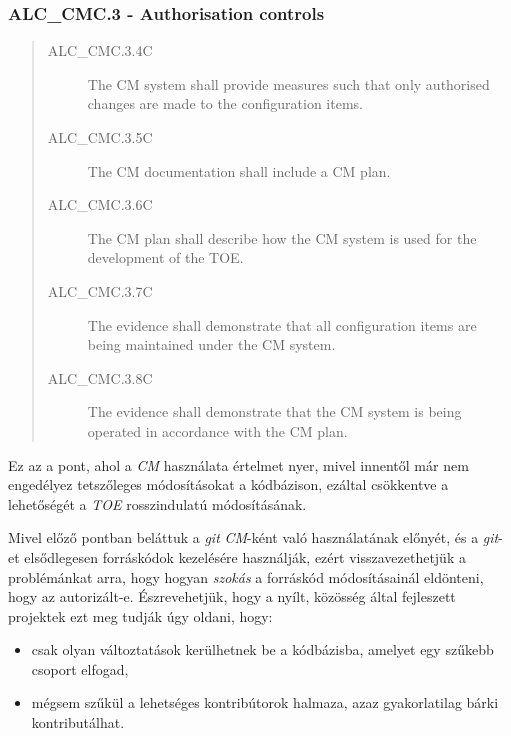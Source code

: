 \subsubsection{ALC\_CMC.3 - Authorisation controls}
\begin{quote}
    \begin{description}
        \item[ALC\_CMC.3.4C]{The CM system shall provide measures such that only authorised changes
            are made to the configuration items.}
        \item[ALC\_CMC.3.5C]{The CM documentation shall include a CM plan.}
        \item[ALC\_CMC.3.6C]{The CM plan shall describe how the CM system is used for the
            development of the TOE.}
        \item[ALC\_CMC.3.7C]{The evidence shall demonstrate that all configuration items are being
            maintained under the CM system.}
        \item[ALC\_CMC.3.8C]{The evidence shall demonstrate that the CM system is being operated in
            accordance with the CM plan.}
    \end{description}
\end{quote}

Ez az a pont, ahol a \emph{CM} használata értelmet nyer, mivel innentől már nem engedélyez
tetszőleges módosításokat a kódbázison, ezáltal csökkentve a lehetőségét a \emph{TOE} rosszindulatú
módosításának.

Mivel előző pontban beláttuk a \emph{git} \emph{CM}-ként való  használatának előnyét, és
a \emph{git}-et elsődlegesen forráskódok kezelésére használják, ezért visszavezethetjük
a problémánkat arra, hogy hogyan \emph{szokás} a forráskód módosításainál eldönteni, hogy az
autorizált-e.  Észrevehetjük, hogy a nyílt, közösség által fejleszett projektek ezt meg tudják úgy
oldani, hogy:
\begin{itemize}
    \item{csak olyan változtatások kerülhetnek be a kódbázisba, amelyet egy szűkebb csoport
        elfogad,}
    \item{mégsem szűkül a lehetséges kontribútorok halmaza, azaz gyakorlatilag bárki
        kontributálhat.}
\end{itemize}

